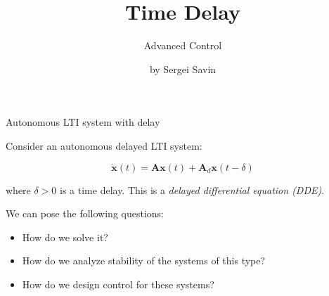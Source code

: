 \documentclass{beamer}
\title{Time Delay}
\subtitle{Advanced Control}
\author{by Sergei Savin}
\date{\mydate}
\begin{document}
\maketitle


%



\begin{frame}{Autonomous LTI system with delay}
	\begin{flushleft}
		
		Consider an autonomous delayed LTI system:
		
		\begin{equation}
			\dot{\mathbf{x}}(t) = \mathbf{A} \mathbf{x}(t) + \mathbf{A}_d \mathbf{x}(t - \delta)
		\end{equation}
		
		where $\delta > 0$ is a time delay. This is a \emph{delayed differential equation (DDE)}.
		
		\bigskip
		
		We can pose the following questions:
		
		\begin{itemize}
			\item How do we solve it?
			
			\item How do we analyze stability of the systems of this type?
			
			\item How do we design control for these systems?
		\end{itemize}
		
		
		
	\end{flushleft}
\end{frame}
\end{document}
